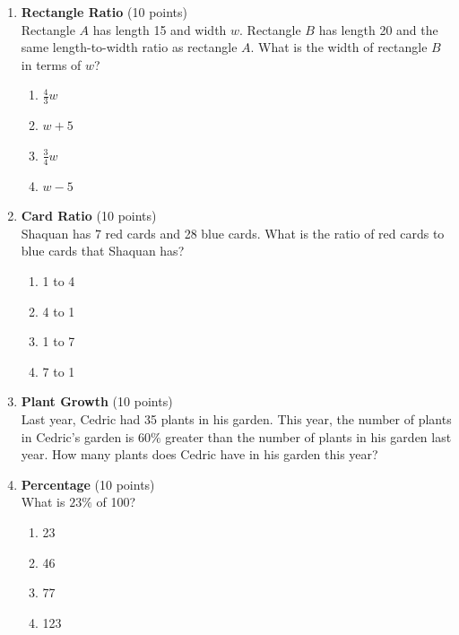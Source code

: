\begin{enumerate}
  \item \textbf{Rectangle Ratio} (10 points)\\
  Rectangle $A$ has length 15 and width $w$. Rectangle $B$ has length 20 and the same length-to-width ratio as rectangle $A$. What is the width of rectangle $B$ in terms of $w$?
  \begin{enumerate}[label=(\Alph*)]
    \item $\frac{4}{3}w$
    \item $w+5$
    \item $\frac{3}{4}w$
    \item $w-5$
  \end{enumerate}
  \begin{subanswer}
  \end{subanswer}

  \item \textbf{Card Ratio} (10 points)\\
  Shaquan has 7 red cards and 28 blue cards. What is the ratio of red cards to blue cards that Shaquan has?
  \begin{enumerate}[label=(\Alph*)]
    \item 1 to 4
    \item 4 to 1
    \item 1 to 7
    \item 7 to 1
  \end{enumerate}
  \begin{subanswer}
  \end{subanswer}

  \item \textbf{Plant Growth} (10 points)\\
  Last year, Cedric had 35 plants in his garden. This year, the number of 
  plants in Cedric's garden is $60\%$ greater than the number of plants in 
  his garden last year. How many plants does Cedric have in his garden this year?
  \begin{subanswer}
  \end{subanswer}

  \newpage

  \item \textbf{Percentage} (10 points)\\
  What is $23\%$ of 100?
  \begin{enumerate}[label=(\Alph*)]
    \item 23
    \item 46
    \item 77
    \item 123
  \end{enumerate}
  \begin{subanswer}
  \end{subanswer}


\end{enumerate}
